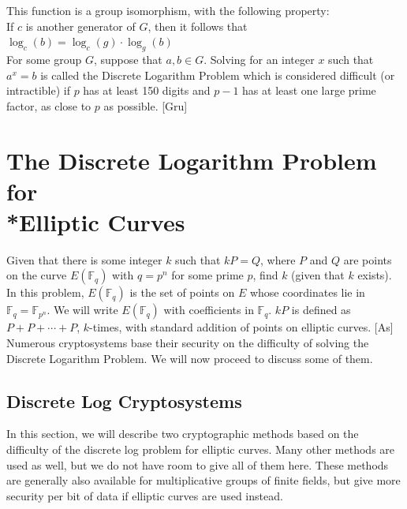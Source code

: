 \documentclass[12pt]{article}
\newcommand{\F}{\mathbb{F}}
\begin{document}
\noindent This function is a group isomorphism, with the following property: \\

If $c$ is another generator of $G$, then it follows that $\log_c(b) = \log_c(g) \cdot \log_g(b)$\\

For some group $G$, suppose that $a,b \in G$. Solving for an integer $x$ such that $a^x = b$ is called the Discrete Logarithm Problem which is considered difficult (or intractible) if $p$ has at least 150 digits and $p-1$ has at least one large prime factor, as close to $p$ as possible. [Gru]





\section{The Discrete Logarithm Problem for \\*Elliptic Curves}

 Given that there is some integer $k$ such that $kP = Q$, where $P$ and $Q$ are points on the curve $E(\F_q)$ with $q = p^n$ for some prime $p$, find $k$ (given that $k$ exists).\\

In this problem, $E(\F_q)$ is the set of points on $E$ whose coordinates lie in $\F_q = \F_{p^n}$. We will write $E(\F_q)$ with coefficients in $\F_q$. $kP$ is defined as $P+P+\cdots+P$, $k$-times, with standard addition of points on elliptic curves. [As]\\

Numerous cryptosystems base their security on the difficulty of solving the Discrete Logarithm Problem. We will now proceed to discuss some of them. 

\subsection{Discrete Log Cryptosystems}

In this section, we will describe two cryptographic methods based on the difficulty of the discrete log problem for elliptic curves. Many other methods are used as well, but we do not have room to give all of them here. These methods are generally also available for multiplicative groups of finite fields, but give more security per bit of data if elliptic curves are used instead. 
\end{document}
